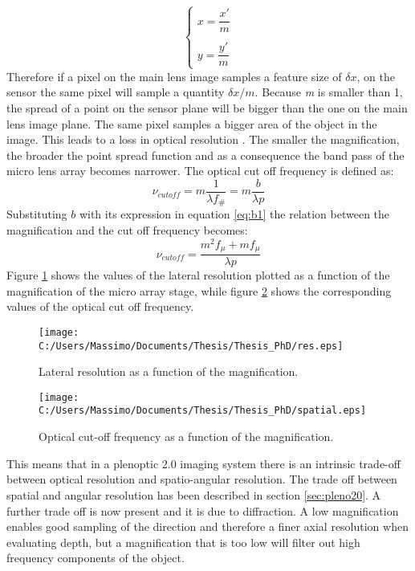 \begin{equation}
	\label{eq:rescale}
	\begin{cases}
		x = \dfrac{x'}{m}
		\\
		\\
		y = \dfrac{y'}{m}
	\end{cases}
\end{equation}   
Therefore if a pixel on the main lens image samples a feature size of $\delta x$, on the sensor the same pixel will sample a quantity $\delta x/m$. Because \textit{m} is smaller than 1, the spread of a point on the sensor plane will be bigger than the one on the main lens image plane. The same pixel samples a bigger area of the object in the image. This leads to a loss in optical resolution \cite{turola2014wave}. The smaller the magnification, the broader the point spread function and as a consequence the band pass of the micro lens array becomes narrower.
The optical cut off frequency is defined as:
\begin{equation}
	\label{eq:cutoff1}
	\nu_{cutoff} = m\dfrac{1}{\lambda f_\#} = m\dfrac{b}{\lambda p}
\end{equation}
Substituting $b$ with its expression in equation \ref{eq:b1} the relation between the magnification and the cut off frequency becomes:
\begin{equation}
\label{eq:cutoff2}
\nu_{cutoff} = \dfrac{m^2f_{\mu}+mf_{\mu}}{\lambda p}
\end{equation} 
Figure \ref{fig:lateral} shows the values of the lateral resolution plotted as a function of the magnification of the micro array stage, while figure \ref{fig:freq} shows the corresponding values of the optical cut off frequency.
\begin{figure}[H]
	\centering
	\texttt{[image: C:/Users/Massimo/Documents/Thesis/Thesis\_PhD/res.eps]}
	\caption{\label{fig:lateral} Lateral resolution as a function of the magnification.}
\end{figure}
\begin{figure}[H]
	\centering
	\texttt{[image: C:/Users/Massimo/Documents/Thesis/Thesis\_PhD/spatial.eps]}
	\caption{\label{fig:freq} Optical cut-off frequency as a function of the magnification.}
\end{figure}
This means that in a plenoptic 2.0 imaging system there is an intrinsic trade-off between optical resolution and spatio-angular resolution. The trade off between spatial and angular resolution has been described in section \ref{sec:pleno20}. A further trade off is now present and it is due to diffraction. A low magnification enables good sampling of the direction and therefore a finer axial resolution when evaluating depth, but a magnification that is too low will filter out high frequency components of the object. \\
